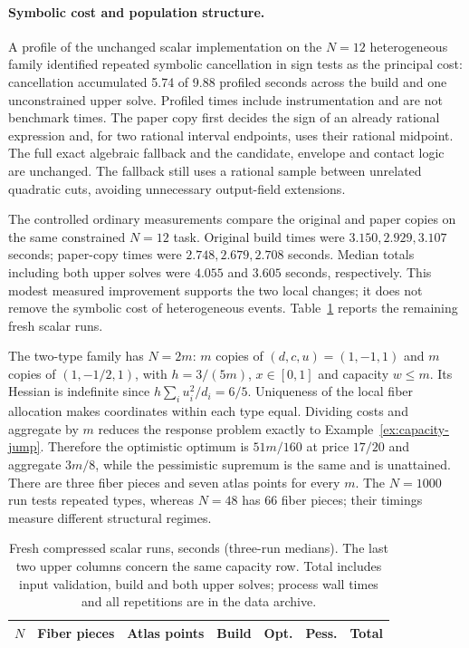 \paragraph{Symbolic cost and population structure.}
A profile of the unchanged scalar implementation on the $N=12$ heterogeneous
family identified repeated symbolic cancellation in sign tests as the principal
cost: cancellation accumulated 5.74 of 9.88 profiled seconds across the build
and one unconstrained upper solve. Profiled times include instrumentation
and are not benchmark times. The paper copy first decides the sign of an
already rational expression and, for two rational interval endpoints, uses
their rational midpoint. The full exact algebraic fallback and the candidate,
envelope and contact logic are unchanged. The fallback still uses a rational
sample between unrelated quadratic cuts, avoiding unnecessary output-field
extensions.

The controlled ordinary measurements compare the original and paper copies on
the same constrained $N=12$ task. Original build times were
$3.150,2.929,3.107$ seconds; paper-copy times were $2.748,2.679,2.708$ seconds.
Median totals including both upper solves were $4.055$ and $3.605$ seconds,
respectively. This modest measured improvement supports the two local changes;
it does not remove the symbolic cost of heterogeneous events.
Table~\ref{tab:scalar-scaling} reports the remaining fresh scalar runs.

The two-type family has $N=2m$: $m$ copies of $(d,c,u)=(1,-1,1)$ and $m$
copies of $(1,-1/2,1)$, with $h=3/(5m)$, $x\in[0,1]$ and capacity $w\le m$.
Its Hessian is indefinite since $h\sum_i u_i^2/d_i=6/5$.
Uniqueness of the local fiber allocation makes coordinates within each type
equal. Dividing costs and aggregate by $m$ reduces the response problem exactly
to Example~\ref{ex:capacity-jump}. Therefore the optimistic optimum is
$51m/160$ at price $17/20$ and aggregate $3m/8$, while the pessimistic
supremum is the same and is unattained. There are three fiber pieces and seven
atlas points for every $m$. The $N=1000$ run tests repeated types, whereas
$N=48$ has 66 fiber pieces; their timings measure different structural regimes.

\begin{table}[t]
\centering\small
\caption{Fresh compressed scalar runs, seconds (three-run medians).
The last two upper columns concern the same capacity row. Total includes input
validation, build and both upper solves; process wall times and all repetitions
are in the data archive.}
\label{tab:scalar-scaling}
\begin{tabular}{lrrrrrr}\toprule
$N$ & Fiber pieces & Atlas points & Build & Opt. & Pess. & Total\\\midrule
\end{tabular}
\end{table}

